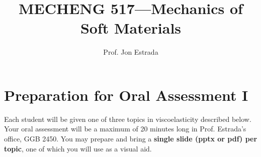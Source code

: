 \documentclass[preprint,12pt,authoryear]{elsarticle}
\begin{document}
\begin{frontmatter}

\title{MECHENG 517---Mechanics of Soft Materials} %

\author{Prof. Jon Estrada} 










\end{frontmatter}

\section*{Preparation for Oral Assessment I}

Each student will be given one of three topics in viscoelasticity described below.  
Your oral assessment will be a maximum of 20 minutes long in Prof. Estrada's office, GGB 2450. 
You may prepare and bring a \textbf{single slide (pptx or pdf) per topic}, one of which you will use as a visual aid. 
\end{document}
